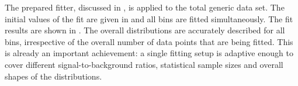 The prepared fitter, discussed in , is applied to the total generic \MC data set.
The initial values of the fit are given in  and all bins are fitted simultaneously.
The fit results are shown in .
The overall \Mbc distributions are accurately described for all \EB bins, irrespective of the overall number of data points that are being fitted.
This is already an important achievement: a single fitting setup is adaptive enough to cover different signal-to-background ratios, statistical sample sizes and overall shapes of the distributions.
\begin{figure}[htbp!]
    \centering
\end{figure}
